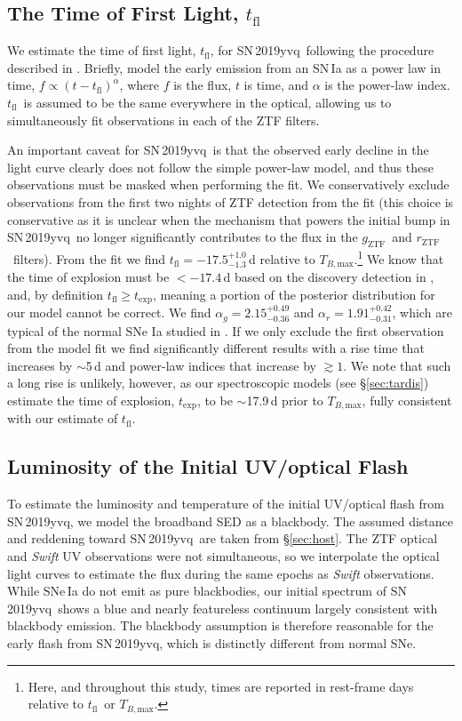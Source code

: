 \documentclass[twocolumn]{aastex63}
\newcommand{\rztf}{$r_\mathrm{ZTF}$}
\newcommand{\gztf}{$g_\mathrm{ZTF}$}
\newcommand{\tfl}{$t_\mathrm{fl}$}
\newcommand{\tbmax}{$T_{B,\mathrm{max}}$}
\newcommand{\sn}{SN\,2019yvq}
\begin{document}
\subsection{The Time of First Light, \tfl}\label{sec:t_fl}

We estimate the time of first light, \tfl, for \sn\ following the procedure
described in \citet{Miller20}. Briefly, \citet{Miller20} model the early
emission from an SN\,Ia as a power law in time, $f \propto (t -
t_\mathrm{fl})^\alpha$, where $f$ is the flux, $t$ is time, and $\alpha$ is
the power-law index. \tfl\ is assumed to be the same everywhere in the
optical, allowing us to simultaneously fit observations in each of the ZTF
filters.

An important caveat for \sn\ is that the observed early decline in the light
curve clearly does not follow the simple power-law model, and thus these
observations must be masked when performing the fit. We conservatively exclude
observations from the first two nights of ZTF detection from the fit (this
choice is conservative as it is unclear when the mechanism that powers the
initial bump in \sn\ no longer significantly contributes to the flux in the
\gztf\ and \rztf\ filters). From the fit we find \tfl$ =
-17.5^{+1.0}_{-1.3}$\,d relative to \tbmax.\footnote{Here, and throughout this
study, times are reported in rest-frame days relative to \tfl\ or \tbmax.} We
know that the time of explosion must be $< -17.4$\,d based on the discovery
detection in \citealt{Itagaki19}, and, by definition $t_\mathrm{fl} \ge
t_\mathrm{exp}$, meaning a portion of the posterior distribution for our model
cannot be correct. We find $\alpha_g = 2.15^{+0.49}_{-0.36}$ and $\alpha_r =
1.91^{+0.42}_{-0.31}$, which are typical of the normal SNe Ia studied in
\citet{Miller20}. If we only exclude the first observation from the model fit
we find significantly different results with a rise time that increases by
$\sim$5\,d and power-law indices that increase by $\gtrsim 1$. We note that
such a long rise is unlikely, however, as our spectroscopic models (see
\S\ref{sec:tardis}) estimate the time of explosion, $t_\mathrm{exp}$, to be
$\sim$17.9\,d prior to \tbmax, fully consistent with our estimate of \tfl.

\subsection{Luminosity of the Initial UV/optical Flash}\label{sec:luminosity}

To estimate the luminosity and temperature of the initial UV/optical flash
from \sn, we model the broadband SED as a
blackbody. The assumed distance and reddening toward \sn\ are taken from
\S\ref{sec:host}. The ZTF optical and \textit{Swift} UV observations were not
simultaneous, so we interpolate the optical light curves to estimate the flux
during the same epochs as \textit{Swift} observations. While SNe\,Ia do not
emit as pure blackbodies, our initial spectrum of \sn\ shows a blue and nearly
featureless continuum largely consistent with blackbody emission. The
blackbody assumption is therefore reasonable for the early flash from \sn,
which is distinctly different from normal SNe.
\end{document}

